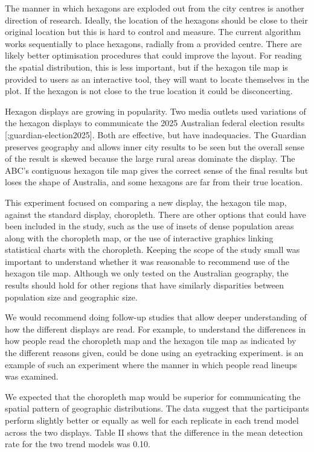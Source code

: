 \documentclass[
doublespace,
  times]{anzsauth}
\begin{document}
The manner in which hexagons are exploded out from the city centres is
another direction of research. Ideally, the location of the hexagons
should be close to their original location but this is hard to control
and measure. The current algorithm works sequentially to place hexagons,
radially from a provided centre. There are likely better optimisation
procedures that could improve the layout. For reading the spatial
distribution, this is less important, but if the hexagon tile map is
provided to users as an interactive tool, they will want to locate
themselves in the plot. If the hexagon is not close to the true location
it could be disconcerting.

Hexagon displays are growing in popularity. Two media outlets used
variations of the hexagon displays to communicate the 2025 Australian
federal election results
{[}\citet{abc-election2025};guardian-election2025{]}. Both are
effective, but have inadequacies. The Guardian preserves geography and
allows inner city results to be seen but the overall sense of the result
is skewed because the large rural areas dominate the display. The ABC's
contiguous hexagon tile map gives the correct sense of the final results
but loses the shape of Australia, and some hexagons are far from their
true location.

This experiment focused on comparing a new display, the hexagon tile
map, against the standard display, choropleth. There are other options
that could have been included in the study, such as the use of insets of
dense population areas along with the choropleth map, or the use of
interactive graphics linking statistical charts with the choropleth.
Keeping the scope of the study small was important to understand whether
it was reasonable to recommend use of the hexagon tile map. Although we
only tested on the Australian geography, the results should hold for
other regions that have similarly disparities between population size
and geographic size.

We would recommend doing follow-up studies that allow deeper
understanding of how the different displays are read. For example, to
understand the differences in how people read the choropleth map and the
hexagon tile map as indicated by the different reasons given, could be
done using an eyetracking experiment. \citet{ZCHMR} is an example of
such an experiment where the manner in which people read lineups was
examined.

We expected that the choropleth map would be superior for communicating
the spatial pattern of geographic distributions. The data suggest that
the participants perform slightly better or equally as well for each
replicate in each trend model across the two displays. Table II shows
that the difference in the mean detection rate for the two trend models
was 0.10.
\end{document}
